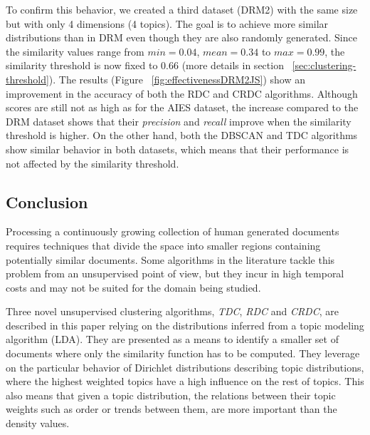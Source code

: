 To confirm this behavior, we created a third dataset (DRM2) with the same size but with only 4 dimensions (4 topics). The goal is to achieve more similar distributions than in DRM even though they are also randomly generated. Since the similarity values range from $min=0.04$, $mean=0.34$ to $max=0.99$, the similarity threshold is now fixed to 0.66 (more details in section ~\ref{sec:clustering-threshold}). The results (Figure ~\ref{fig:effectivenessDRM2JS}) show an improvement in the accuracy of both the RDC and CRDC algorithms. Although scores are still not as high as for the AIES dataset, the increase compared to the DRM dataset shows that their \textit{precision} and \textit{recall} improve when the similarity threshold is higher. On the other hand, both the DBSCAN and TDC algorithms show similar behavior in both datasets, which means that their performance is not affected by the similarity threshold.

\subsection{Conclusion}
\label{sec:clustering-conclusion}

Processing a continuously growing collection of human generated documents requires techniques that divide the space into smaller regions containing potentially similar documents. Some algorithms in the literature tackle this problem from an unsupervised point of view, but they incur in high temporal costs and may not be suited for the domain being studied.

Three novel unsupervised clustering algorithms, \textit{TDC}, \textit{RDC} and \textit{CRDC}, are described in this paper relying on the distributions inferred from a topic modeling algorithm (LDA). They are presented as a means to identify a smaller set of documents where only the similarity function has to be computed. They leverage on the particular behavior of Dirichlet distributions describing topic distributions, where the highest weighted topics have a high influence on the rest of topics. This also means that given a topic distribution, the relations between their topic weights such as order or trends between them, are more important than the density values.

